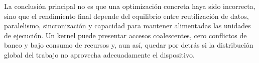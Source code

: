 La conclusión principal no es que una optimización concreta haya sido incorrecta, sino que el rendimiento final depende del equilibrio entre reutilización de datos, paralelismo, sincronización y capacidad para mantener alimentadas las unidades de ejecución. Un kernel puede presentar accesos coalescentes, cero conflictos de banco y bajo consumo de recursos y, aun así, quedar por detrás si la distribución global del trabajo no aprovecha adecuadamente el dispositivo.
